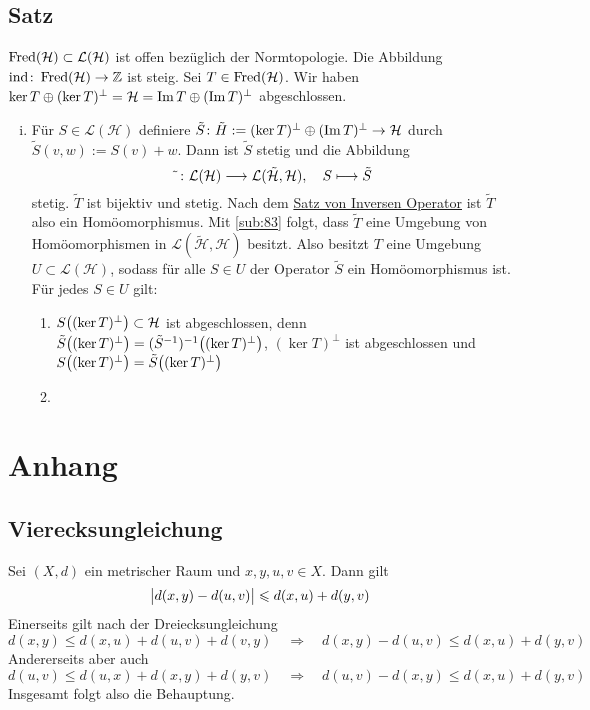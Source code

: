 \subsection{Satz} %
\label{sub:93}
$\Fred(\mathcal{H}) \subset \mathcal{L}(\mathcal{H})$ ist offen bezüglich der Normtopologie. Die Abbildung $\idx \colon \Fred(\mathcal{H}) \to \mathds{Z}$ ist steig.
Sei $T \in \Fred(\mathcal{H})$. Wir haben $\ker T \oplus (\ker T)^\bot = \mathcal{H} = \im T \oplus (\im T)^\bot$ abgeschlossen.
\begin{enumerate}[(i)]
	\item Für $S \in \mathcal{L}(\mathcal{H})$ definiere $\tilde{S} \colon \tilde{H} := (\ker T)^\bot \oplus (\im T)^\bot \to \mathcal{H}$ durch
	$\tilde{S}(v,w) := S(v)+w$. Dann ist $\tilde{S}$ stetig und die Abbildung 
	\[
		\tilde{\minwidthbox{ }{5pt}} \colon \mathcal{L}(\mathcal{H}) \longrightarrow \mathcal{L}(\tilde{\mathcal{H}}, \mathcal{H}) , \quad S \longmapsto \tilde{S}
	\]
	stetig. $\tilde{T}$ ist bijektiv und stetig. Nach dem \hyperref[sub:39]{Satz von Inversen Operator} ist $\tilde{T}$ also ein Homöomorphismus. Mit \ref{sub:83} folgt,
	dass $\tilde{T}$ eine Umgebung von Homöomorphismen in $\mathcal{L}(\tilde{\mathcal{H}},\mathcal{H})$ besitzt. Also besitzt $T$ eine Umgebung 
	$U \subset \mathcal{L}(\mathcal{H})$, sodass für alle $S \in U$ der Operator $\tilde{S}$ ein Homöomorphismus ist. Für jedes $S \in U$ gilt:
	\begin{enumerate}[1)]
		\item $S\enbrace*{(\ker T)^\bot} \subset \mathcal{H}$ ist abgeschlossen, denn $\tilde{S}\enbrace*{(\ker T)^\bot}= (\tilde{S}^{-1})^{-1}\enbrace*{(\ker T)^\bot}$, 
		$(\ker T)^\bot$ ist abgeschlossen und $S\enbrace*{(\ker T)^\bot} = \tilde{S} \enbrace*{(\ker T)^\bot}$
		\item 
	\end{enumerate}
\end{enumerate}

\cleardoubleoddemptypage
\appendix
\section{Anhang} %
\label{sec:anhang}

\subsection{Vierecksungleichung} %
\label{sub:vier_ungl}
Sei $(X,d)$ ein metrischer Raum und $x,y,u,v \in X$. Dann gilt
\[
	\abs[\big]{d(x,y) - d(u,v)} \le d(x,u) + d(y,v) 
\]
Einerseits gilt nach der Dreiecksungleichung
\[
	d(x,y) \le d(x,u) + d(u,v) + d(v,y) \quad \Longrightarrow \quad d(x,y) - d(u,v) \le d(x,u) + d(y,v)
\]
Andererseits aber auch
\[
	d(u,v) \le d(u,x) + d(x,y) + d(y,v) \quad \Longrightarrow \quad d(u,v) - d(x,y) \le d(x,u) + d(y,v)
\]
Insgesamt folgt also die Behauptung. \bewende

